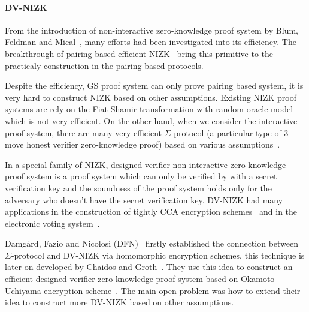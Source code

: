 \paragraph{DV-NIZK}
From the introduction of non-interactive zero-knowledge proof system by Blum, Feldman and Mical~\cite{DBLP:conf/stoc/BlumFM88},
many efforts had been investigated into its efficiency.
The breakthrough of pairing based efficient NIZK~\cite{DBLP:conf/eurocrypt/GrothS08} bring this primitive to the practicaly construction in the pairing based protocols.

Despite the efficiency, GS proof system can only prove pairing based system, it is very hard to construct NIZK based on other assumptions.
Existing NIZK proof systems are rely on the Fiat-Shamir transformation with random oracle model which is not very efficient.
On the other hand, when we consider the interactive proof system,
there are many very efficient $\Sigma$-protocol (a particular type of 3-move honest verifier zero-knowledge proof) based on various assumptions~\cite{DBLP:journals/iacr/BaumDOP16}\cite{DBLP:conf/crypto/BaumDLN16}.

In a special family of NIZK, designed-verifier non-interactive zero-knowledge proof system is a proof system which can only be verified by with a secret verification key
and the soundness of the proof system holds only for the adversary who doesn't have the secret verification key.
DV-NIZK had many applications in the construction of tightly CCA encryption schemes~\cite{DBLP:conf/eurocrypt/GayHKW16} and in the electronic voting system~\cite{DBLP:conf/pkc/ChaidosG15}.


Damg\r{a}rd, Fazio and Nicolosi (DFN)~\cite{DBLP:conf/tcc/DamgardFN06} firstly established the connection between $\Sigma$-protocol and DV-NIZK via homomorphic encryption schemes,
this technique is later on developed by Chaidos and Groth~\cite{DBLP:conf/pkc/ChaidosG15}.
They use this idea to construct an efficient designed-verifier zero-knowledge proof system based on Okamoto-Uchiyama encryption scheme~\cite{DBLP:conf/eurocrypt/OkamotoU98}.
The main open problem was how to extend their idea to construct more DV-NIZK based on other assumptions.
